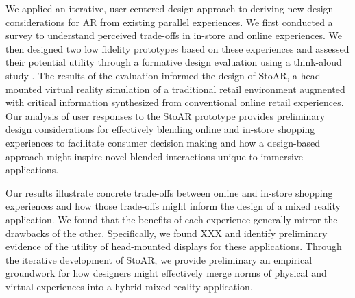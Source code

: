 We applied  an iterative, user-centered design approach to deriving new design considerations for AR from existing parallel experiences. We first conducted a survey to understand perceived trade-offs in in-store and online experiences.  We then designed two low fidelity prototypes based on these experiences and assessed their potential utility through a formative design evaluation using a think-aloud study . The results of the evaluation informed the design of StoAR, a head-mounted virtual reality simulation of a traditional retail environment augmented with critical information  synthesized from conventional online retail experiences. Our analysis of user responses to the StoAR prototype  provides preliminary design considerations for effectively blending online and in-store shopping experiences to facilitate consumer decision making and how a design-based approach might inspire novel blended interactions unique to immersive applications.

Our results illustrate concrete trade-offs between online and in-store shopping experiences and how those trade-offs might inform the design of a mixed reality application. We found that the benefits of each experience generally mirror the drawbacks of the other.  Specifically, we found XXX and identify preliminary evidence of the utility of head-mounted displays for these applications. Through the iterative development of StoAR, we provide preliminary an empirical groundwork for how designers might effectively merge norms of physical and virtual experiences into a hybrid mixed reality application. 


